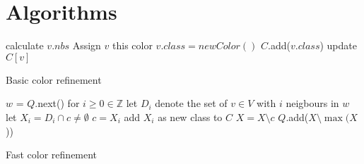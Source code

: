 \documentclass[twoside]{article}
\begin{document}
\begin{appendices}
\label{app}

\section{Algorithms}
\label{app:algs}
\begin{algorithm}
    \begin{algorithmic}[1] %
             
            	 	\State calculate $v.nbs$ 
            	  	 
            	  		 
            	  			\State Assign $v$ this color
            	  		\Else
            	  			\State $v.class = newColor()$
            	  			\State $C$.add($v.class$)            	  		
            	  		\EndIf
    				\EndIf
            	  \EndFor
					\State update $C[v]$
				\EndFor
            \EndWhile
        \EndProcedure {}
    \end{algorithmic}
    \caption{Basic color refinement}
    \label{alg:basic}
\end{algorithm}

\begin{algorithm}
    \begin{algorithmic}[1]
    			\State $w$ = $Q$.next()
    			\State for $i \geq 0 \in \mathbb{Z}$ let $D_i$ denote the set of $v \in V$ with $i$ neigbours in $w$ 
    				\State let $X_i = D_i \cap c \neq \emptyset$
    						\State $c = X_i$
    					\Else
    						\State add $X_i$ as new class to $C$
    					\EndIf    					
    				\EndFor
    				\State $X = X \setminus c$
    			\EndIf
    			\State $Q$.add($X \setminus \max (X$))
    			\EndFor 			
    			
    		\EndWhile 
        \EndProcedure
    \end{algorithmic}
    \caption{Fast color refinement}
    \label{alg:fast}
\end{algorithm}


\end{appendices}
\end{document}
